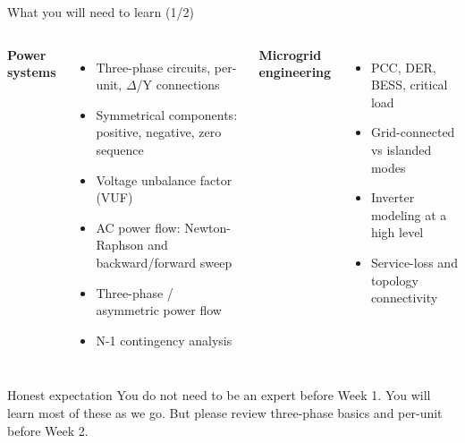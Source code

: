 \documentclass[aspectratio=169,10pt]{beamer}
\begin{document}
\begin{frame}{What you will need to learn (1/2)}
\begin{columns}[T]
\textbf{Power systems}
\begin{itemize}
  \item Three-phase circuits, per-unit, $\Delta$/Y connections
  \item Symmetrical components: positive, negative, zero sequence
  \item Voltage unbalance factor (VUF)
  \item AC power flow: Newton-Raphson and backward/forward sweep
  \item Three-phase / asymmetric power flow
  \item N-1 contingency analysis
\end{itemize}
\textbf{Microgrid engineering}
\begin{itemize}
  \item PCC, DER, BESS, critical load
  \item Grid-connected vs islanded modes
  \item Inverter modeling at a high level
  \item Service-loss and topology connectivity
\end{itemize}
\end{columns}
\vspace{0.5em}
\begin{alertblock}{Honest expectation}
You do not need to be an expert before Week 1. You will learn most of these as we go. But please review three-phase basics and per-unit before Week 2.
\end{alertblock}
\end{frame}
\end{document}
